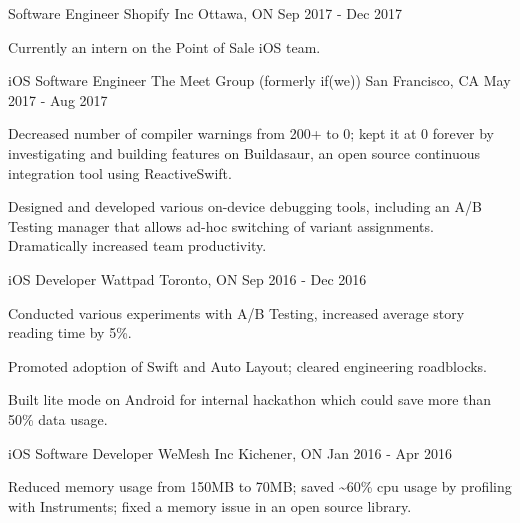 \begin{cventries}
  \cventry
    {Software Engineer}
    {Shopify Inc}
    {Ottawa, ON}
    {Sep 2017 - Dec 2017}
    {
      \begin{cvitems}
        \item {Currently an intern on the Point of Sale iOS team.}
      \end{cvitems}
    }
  \cventry
    {iOS Software Engineer}
    {The Meet Group (formerly if(we))}
    {San Francisco, CA}
    {May 2017 - Aug 2017}
    {
      \begin{cvitems}
        \item {Decreased number of compiler warnings from 200+ to 0; kept it at 0 forever by investigating and building features on Buildasaur, an open source continuous integration tool using ReactiveSwift. }
        \item {Designed and developed various on-device debugging tools, including an A/B Testing manager that allows ad-hoc switching of variant assignments. Dramatically increased team productivity. }
      \end{cvitems}
    }
  \cventry
    {iOS Developer}
    {Wattpad}
    {Toronto, ON}
    {Sep 2016 - Dec 2016}
    {
      \begin{cvitems}
        \item {Conducted various experiments with A/B Testing, increased average story reading time by 5\%.}
        \item {Promoted adoption of Swift and Auto Layout; cleared engineering roadblocks.}
        \item {Built lite mode on Android for internal hackathon which could save more than 50\% data usage.}
      \end{cvitems} 
    }
  \cventry
    {iOS Software Developer}
    {WeMesh Inc}
    {Kichener, ON}
    {Jan 2016 - Apr 2016}
    {
      \begin{cvitems}
        \item {Reduced memory usage from 150MB to 70MB; saved \textasciitilde60\% cpu usage by profiling with Instruments; fixed a memory issue in an open source library.}
      \end{cvitems}
    }
\end{cventries}
